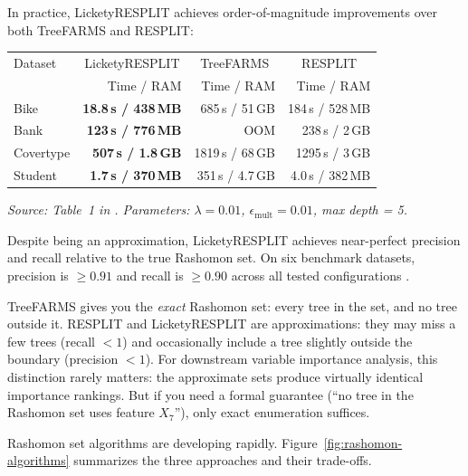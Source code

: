 In practice, LicketyRESPLIT achieves order-of-magnitude improvements over
both TreeFARMS and RESPLIT:

\begin{center}
\begin{tabular}{lrrr}
\toprule
Dataset & \multicolumn{1}{c}{LicketyRESPLIT} & \multicolumn{1}{c}{TreeFARMS} & \multicolumn{1}{c}{RESPLIT} \\
        & Time / RAM & Time / RAM & Time / RAM \\
\midrule
Bike       & \textbf{18.8\,s / 438\,MB} & 685\,s / 51\,GB & 184\,s / 528\,MB \\
Bank       & \textbf{123\,s / 776\,MB}   & OOM              & 238\,s / 2\,GB \\
Covertype  & \textbf{507\,s / 1.8\,GB}   & 1819\,s / 68\,GB & 1295\,s / 3\,GB \\
Student    & \textbf{1.7\,s / 370\,MB}   & 351\,s / 4.7\,GB & 4.0\,s / 382\,MB \\
\bottomrule
\end{tabular}
\end{center}
\emph{Source: Table~1 in \citet{HeileBabbar2025}.  Parameters: $\lambda = 0.01$,
$\epsilon_{\text{mult}} = 0.01$, max depth = 5.}

Despite being an approximation, LicketyRESPLIT achieves near-perfect
precision and recall relative to the true Rashomon set.  On six benchmark
datasets, precision is $\geq 0.91$ and recall is $\geq 0.90$ across all
tested configurations \citep{HeileBabbar2025}.

\begin{warning}
TreeFARMS gives you the \emph{exact} Rashomon set: every tree in the set, and
no tree outside it.  RESPLIT and LicketyRESPLIT are approximations: they
may miss a few trees (recall $< 1$) and occasionally include a tree slightly
outside the boundary (precision $< 1$).  For downstream variable importance
analysis, this distinction rarely matters: the approximate sets produce
virtually identical importance rankings.  But if you need a formal guarantee
(``no tree in the Rashomon set uses feature $X_7$''), only exact enumeration
suffices.
\end{warning}

Rashomon set algorithms are developing rapidly.
Figure~\ref{fig:rashomon-algorithms} summarizes the three approaches and
their trade-offs.

